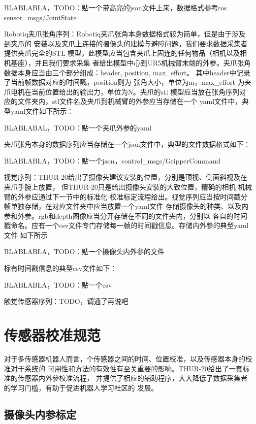   BLABLABLA，TODO：贴一个带高亮的json文件上来，数据格式参考ros sensor\_msgs/JointState

  Robotiq夹爪张角序列：Robotiq夹爪张角本身数据格式较为简单，但是由于涉及到夹爪的
  安装以及夹爪上连接的摄像头的建模与避障问题，我们要求数据采集者提供夹爪完全的STL
  模型，此模型应当包含夹爪上固连的任何物品（相机以及相机基座），并且我们要求采集
  者给出模型中心到UR5机械臂末端的外参。夹爪张角数据本身应当由三个部分组成：header,
  position, max\_effort。 其中header中记录了当前帧数据对应的时间戳，position则为
  张角大小，单位为m，max\_effort 为夹爪电机在当前位置给出的输出力，单位为N。夹爪的stl
  模型应当放在张角序列对应的文件夹内，stl文件名及夹爪到机械臂的外参应当存储在一个
  yaml文件中，典型yaml文件如下所示：

  BLABLABAL，TODO：贴一个夹爪外参的yaml

  夹爪张角本身的数据序列应当存储在一个json文件中，典型的文件数据格式如下：

  BLABLABLA，TODO：贴一个json，control\_msgs/GripperCommand

  视觉序列：THUR-20给出了摄像头建议安装的位置，分别是顶视、侧面斜视及在夹爪手腕上放置，
  但THUR-20只是给出摄像头安装的大致位置，精确的相机-机械臂的外参应通过下一节中的标准化
  校准标定流程给出。视觉序列应当按时间戳分帧单独存储，在对应文件夹中应当放置一个yaml文件
  存储摄像头的种类、以及内参和外参。rgb和depth图像应当分开存储在不同的文件夹内，分别以
  各自的时间戳命名。应有一个csv文件专门存储每一帧的时间戳信息。存储内外參的典型yaml文件
  如下所示

  BLABLABLA，TODO：贴一个摄像头内外参的文件

  标有时间戳信息的典型csv文件如下：

  BLABLABLA，TODO：贴一个csv

  触觉传感器序列：TODO，调通了再说吧


\section{传感器校准规范}
\label{sec:calibration}

对于多传感器机器人而言，个传感器之间的时间、位置校准，以及传感器本身的校准对于系统的
可用性和方法的有效性有至关重要的影响。THUR-20给出了一套标准的传感器内外參校准流程，
并提供了相应的辅助程序，大大降低了数据采集者的学习门槛，有助于促进机器人学习社区的
发展。

\subsection{摄像头内参标定}
\label{subsec:cam_intrinsic}

